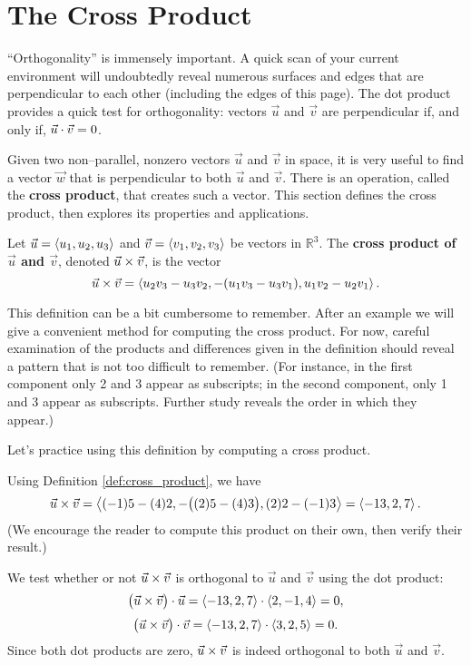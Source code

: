 \section{The Cross Product}\label{sec:cross_product}

``Orthogonality'' is immensely important. A quick scan of your current environment will undoubtedly reveal numerous surfaces and edges that are perpendicular to each other (including the edges of this page). The dot product provides a quick test for orthogonality:  vectors $\vec u$ and $\vec v$ are perpendicular if, and only if, $\vec u \cdot \vec v=0$. 

Given two non--parallel, nonzero vectors $\vec u$ and $\vec v$ in space, it is very useful to find a vector $\vec w$ that is perpendicular to both $\vec u$ and $\vec v$. There is an operation, called the \textbf{cross product}, that creates such a vector. This section defines the cross product, then explores its properties and applications.

{Let $\vec u =\left\langle u_1,u_2,u_3\right\rangle$ and $\vec v = \left\langle v_1,v_2,v_3\right\rangle$ be vectors in $\mathbb{R}^3$. The \textbf{cross product of $\vec u$ and $\vec v$}, denoted $\vec u \times \vec v$, is the vector
$$\vec u \times \vec v = \left\langle u_2v_3-u_3v_2,-(u_1v_3-u_3v_1),u_1v_2-u_2v_1\right\rangle.$$
}

This definition can be a bit cumbersome to remember. After an example we will give a convenient method for computing the cross product. For now, careful examination of the products and differences given in the definition should reveal a pattern that is not too difficult to remember. (For instance, in the first component only 2 and 3 appear as subscripts; in the second component, only 1 and 3 appear as subscripts. Further study reveals the order in which they appear.)

Let's practice using this definition by computing a cross product.\\

{Using Definition \ref{def:cross_product}, we have
$$\vec u \times \vec v = \left\langle (-1)5-(4)2,-\big((2)5-(4)3\big), (2)2-(-1)3\right\rangle = \left\langle -13,2,7\right\rangle.$$ 
(We encourage the reader to compute this product on their own, then verify their result.)

\enlargethispage{2\baselineskip}
We test whether or not $\vec u \times \vec v$ is orthogonal to $\vec u$ and $\vec v$ using the dot product:
$$\big(\vec u \times \vec v\big) \cdot \vec u = \left\langle -13,2,7\right\rangle \cdot \left\langle 2,-1,4\right\rangle = 0,$$
$$\big(\vec u \times \vec v\big) \cdot \vec v = \left\langle -13,2,7\right\rangle \cdot \left\langle 3,2,5 \right\rangle = 0.$$
Since both dot products are zero, $\vec u \times \vec v$ is indeed orthogonal to both $\vec u$ and $\vec v$.
}\\

